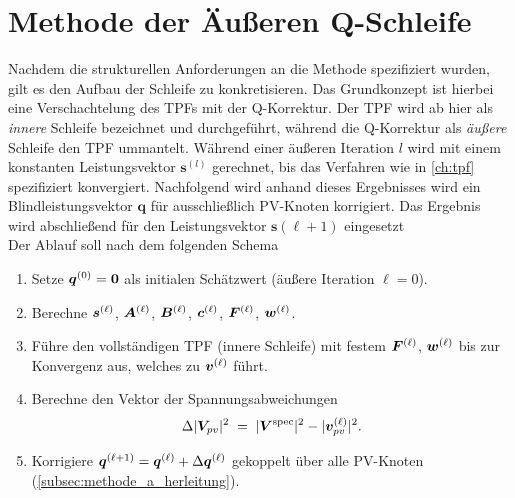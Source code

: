 \section{Methode der Äußeren Q-Schleife}
\label{sec:methode_a}




Nachdem die strukturellen Anforderungen an die Methode spezifiziert wurden, gilt es den Aufbau der Schleife zu konkretisieren.
Das Grundkonzept ist hierbei eine Verschachtelung des TPFs mit der Q-Korrektur.
Der TPF wird ab hier als \emph{innere} Schleife bezeichnet und durchgeführt, während die Q-Korrektur als \emph{äußere} Schleife  den TPF ummantelt.
Während einer äußeren Iteration $l$ wird mit einem konstanten Leistungsvektor $\mathbf{s}^{(l)}$ gerechnet, bis das Verfahren wie in \cref{ch:tpf} spezifiziert konvergiert.
Nachfolgend wird anhand dieses Ergebnisses wird ein Blindleistungsvektor $\mathbf{q}$ für ausschließlich PV-Knoten korrigiert.
Das Ergebnis wird abschließend für den Leistungsvektor $\mathbf{s}{(\ell+1)}$ eingesetzt\\



Der Ablauf soll nach dem folgenden Schema
\begin{enumerate}
	\item Setze $\boldsymbol{q}^{(0)} = \boldsymbol{0}$ als initialen Schätzwert
	(äußere Iteration $\ell = 0$).
	\item Berechne $\boldsymbol{s}^{(\ell)}$, $\boldsymbol{A}^{(\ell)}$,
	$\boldsymbol{B}^{(\ell)}$, $\boldsymbol{c}^{(\ell)}$, $\boldsymbol{F}^{(\ell)}$,
	$\boldsymbol{w}^{(\ell)}$.
	\item Führe den vollständigen TPF (innere Schleife) mit festem
	$\boldsymbol{F}^{(\ell)}$, $\boldsymbol{w}^{(\ell)}$ bis zur Konvergenz aus,
	welches zu $\boldsymbol{v}^{(\ell)}$ führt.
	\item Berechne den Vektor der Spannungsabweichungen
	\[
	\Delta|\boldsymbol{V}_{pv}|^2
	\;=\; |\boldsymbol{V}^{\mathrm{spec}}|^2 - |\boldsymbol{v}^{(\ell)}_{pv}|^2.
	\]
	\item Korrigiere $\boldsymbol{q}^{(\ell+1)} = \boldsymbol{q}^{(\ell)} + \Delta\boldsymbol{q}^{(\ell)}$
	{gekoppelt} über alle PV-Knoten
	(\cref{subsec:methode_a_herleitung}).
\end{enumerate}

